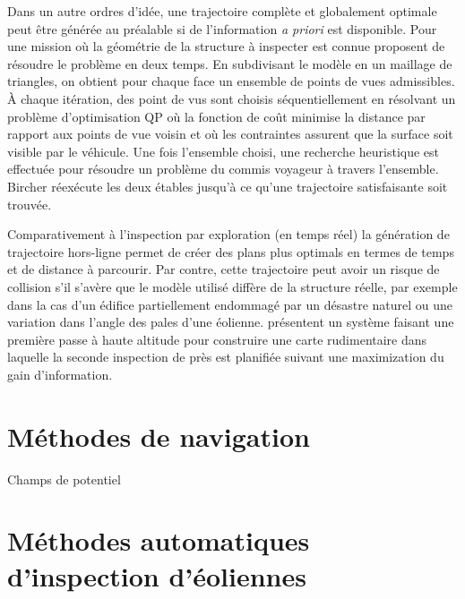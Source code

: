 Dans un autre ordres d'idée, une trajectoire complète et globalement optimale peut être générée au préalable si de l'information \textit{a priori} est disponible. Pour une mission où la géométrie de la structure à inspecter est connue \citep{Bircher2015} proposent de résoudre le problème en deux temps. En subdivisant le modèle en un maillage de triangles, on obtient pour chaque face un ensemble de points de vues admissibles. À chaque itération, des point de vus sont choisis séquentiellement en résolvant un problème d'optimisation QP où la fonction de coût minimise la distance par rapport aux points de vue voisin et où les contraintes assurent que la surface soit visible par le véhicule. Une fois l'ensemble choisi, une recherche heuristique est effectuée pour résoudre un problème du commis voyageur à travers l'ensemble. Bircher réexécute les deux étables jusqu'à ce qu'une trajectoire satisfaisante soit trouvée.

Comparativement à l'inspection par exploration (en temps réel) la génération de trajectoire hors-ligne permet de créer des plans plus optimals en termes de temps et de distance à parcourir. Par contre, cette trajectoire peut avoir un risque de collision s'il s'avère que le modèle utilisé diffère de la structure réelle, par exemple dans la cas d'un édifice partiellement endommagé par un désastre naturel ou une variation dans l'angle des pales d'une éolienne. \citep{Hepp2017} présentent un système faisant une première passe à haute altitude pour construire une carte rudimentaire dans laquelle la seconde inspection de près est planifiée suivant une maximization du gain d'information.

\section{Méthodes de navigation}\label{subsec:navigation}

Champs de potentiel

\section{Méthodes automatiques d'inspection d'éoliennes}\label{subsec:eolienne}

